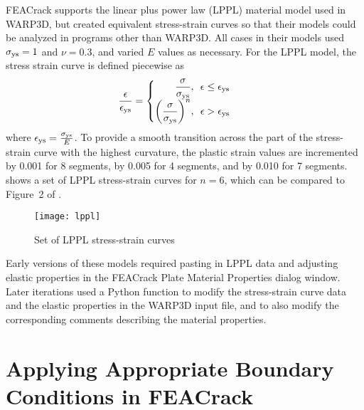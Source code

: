 FEACrack supports the linear plus power law (LPPL) material model used in WARP3D, but \citeauthor{allenwells2014} created equivalent stress-strain curves so that their models could be analyzed in programs other than WARP3D.
All cases in their models used \(\sigma_{\textnormal{ys}}=1\) and \(\nu=0.3\), and varied \(E\) values as necessary.
For the LPPL model, the stress strain curve is defined piecewise as
\begin{align*}
\frac{\epsilon}{\epsilon_\text{ys}} &= 
\begin{cases}
\begin{aligned} %
\hspace*{0.77em} \dfrac{\sigma}{\Sys} &,\enskip \epsilon \leq \epsilon_\text{ys} \\
\left(\dfrac{\sigma}{\Sys}\right)^{n} &,\enskip \epsilon > \epsilon_\text{ys}
\end{aligned}
\end{cases}
\end{align*}
where \(\epsilon_\text{ys} = \frac{\sigma_{\textnormal{ys}}}{E}\).
To provide a smooth transition across the part of the stress-strain curve with the highest curvature, the plastic strain values are incremented by 0.001 for 8 segments, by 0.005 for 4 segments, and by 0.010 for 7 segments.
 shows a set of LPPL stress-strain curves for \(n=6\), which can be compared to Figure~2 of \citeauthor[p.~177]{allenwells2014}.
\begin{figure}[tbp]
\centering
\texttt{[image: lppl]}
\caption{\label{fig:lppl} Set of LPPL stress-strain curves}
\end{figure}
Early versions of these models required pasting in LPPL data and adjusting elastic properties in the FEACrack Plate Material Properties dialog window.
Later iterations used a Python function to modify the stress-strain curve data and the elastic properties in the WARP3D input file, and to also modify the corresponding comments describing the material properties.

\section{Applying Appropriate Boundary Conditions in FEACrack}

